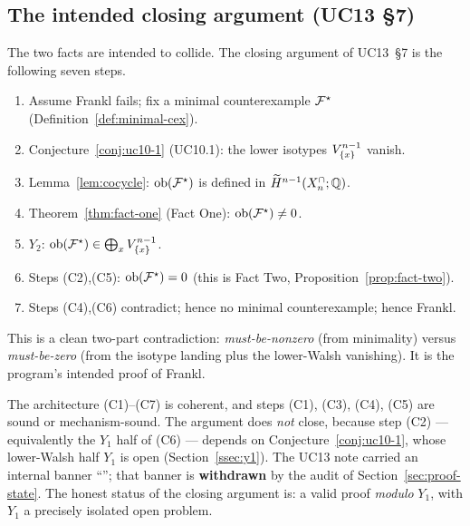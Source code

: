 \subsection{The intended closing argument (UC13 \S7)}
\label{ssec:closing}

The two facts are intended to collide. The closing argument of UC13~\S7
is the following seven steps.

\begin{enumerate}[label=\textup{(C\arabic*)},leftmargin=3.1em]
\item Assume Frankl fails; fix a minimal counterexample $\mathcal{F}^{\star}$
  (Definition~\ref{def:minimal-cex}).
\item Conjecture~\ref{conj:uc10-1} (UC10.1): the lower isotypes
  $V_{\{x\}}^{n-1}$ vanish.
\item Lemma~\ref{lem:cocycle}: $\mathrm{ob}(\mathcal{F}^{\star})$ is defined in
  $\widetilde H^{n-1}(X^{\cap}_n;\mathbb{Q})$.
\item Theorem~\ref{thm:fact-one} (Fact One): $\mathrm{ob}(\mathcal{F}^{\star})\neq0$.
\item $Y_2$: $\mathrm{ob}(\mathcal{F}^{\star})\in\bigoplus_xV_{\{x\}}^{n-1}$.
\item Steps (C2),(C5): $\mathrm{ob}(\mathcal{F}^{\star})=0$ (this is Fact Two,
  Proposition~\ref{prop:fact-two}).
\item Steps (C4),(C6) contradict; hence no minimal counterexample;
  hence Frankl.
\end{enumerate}

This is a clean two-part contradiction: \emph{must-be-nonzero} (from
minimality) versus \emph{must-be-zero} (from the isotype landing plus
the lower-Walsh vanishing). It is the program's intended proof of
Frankl.

\begin{status}
\label{status:closing}
The architecture (C1)--(C7) is coherent, and steps (C1), (C3), (C4),
(C5) are sound or mechanism-sound. The argument does \emph{not} close,
because step (C2) --- equivalently the $Y_1$ half of (C6) --- depends on
Conjecture~\ref{conj:uc10-1}, whose lower-Walsh half $Y_1$ is open
(Section~\ref{ssec:y1}). The UC13 note carried an internal banner
``''; that banner is
\textbf{withdrawn} by the audit of Section~\ref{sec:proof-state}. The
honest status of the closing argument is: a valid proof \emph{modulo}
$Y_1$, with $Y_1$ a precisely isolated open problem.
\end{status}

